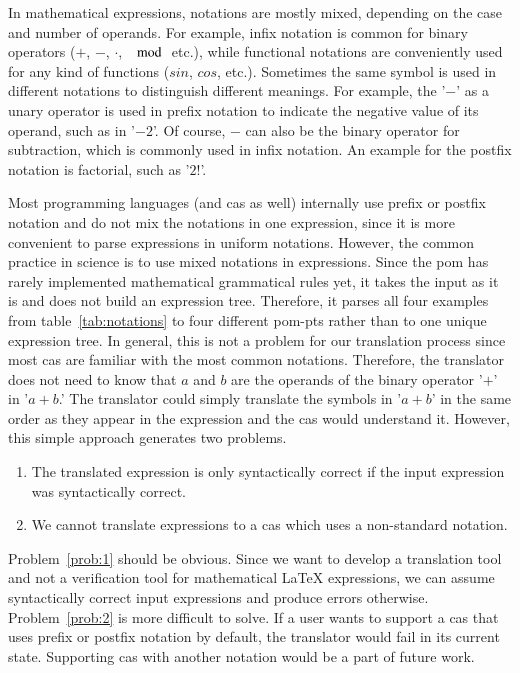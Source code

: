 In mathematical expressions, notations are mostly mixed, depending on the case and number of operands. For example, infix notation is common for binary operators ($+$, $-$, $\cdot$, $\mod$ etc.), while functional notations are conveniently used for any kind of functions ($sin$, $cos$, etc.). Sometimes the same symbol is used in different notations to distinguish different meanings. For example, the '$-$' as a unary operator is used in prefix notation to indicate the negative value of its operand, such as in '$-2$'. Of course, $-$ can also be the binary operator for subtraction, which is commonly used in infix notation. An example for the postfix notation is factorial, such as '$2!$'.



Most programming languages (and \gls*{cas} as well) internally use prefix or postfix notation and do not mix the notations in one expression, since it is more convenient to parse expressions in uniform notations. However, the common practice in science is to use mixed notations in expressions. Since the \gls*{pom} has rarely implemented mathematical grammatical rules yet, it takes the input as it is and does not build an expression tree. Therefore, it parses all four examples from table~\ref{tab:notations} to four different \gls*{pom-pt}s rather than to one unique expression tree. In general, this is not a problem for our translation process since most \gls*{cas} are familiar with the most common notations. Therefore, the translator does not need to know that $a$ and $b$ are the operands of the binary operator '$+$' in '$a+b$.' The translator could simply translate the symbols in '$a+b$' in the same order as they appear in the expression and the \gls*{cas} would understand it. However, this simple approach generates two problems.
\begin{enumerate}%
\item \label{prob:1} The translated expression is only syntactically correct if the input expression was syntactically correct.
\item \label{prob:2} We cannot translate expressions to a \gls*{cas} which uses a non-standard notation.
\end{enumerate}

Problem~\ref{prob:1} should be obvious. Since we want to develop a translation tool and not a verification tool for mathematical \LaTeX{} expressions, we can assume syntactically correct input expressions and produce errors otherwise. Problem~\ref{prob:2} is more difficult to solve. If a user wants to support a \gls*{cas} that uses prefix or postfix notation by default, the translator would fail in its current state. Supporting \gls*{cas} with another notation would be a part of future work.

